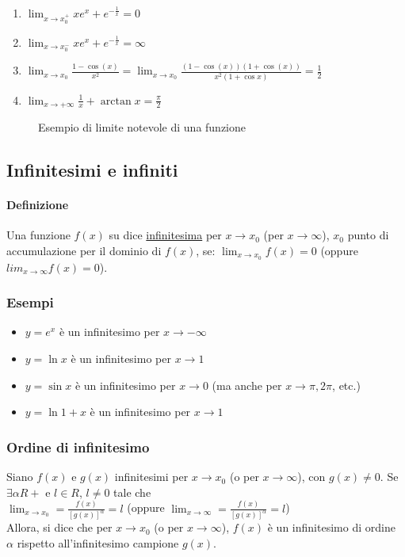 \begin{multicols}{2}
	\begin{enumerate}
		\item $\lim_{x\to x_0^+}xe^x+e^{-\frac{1}{x}}=0$
		\item $\lim_{x\to x_0^-}xe^x+e^{-\frac{1}{x}}=\infty$
		\item $\lim_{x\to x_0}\frac{1-\cos (x)}{x^2}=\lim_{x\to
			x_0}\frac{(1-\cos (x))(1+\cos (x))}{x^2(1+\cos x)}=\frac{1}{2}$
		\item $\lim_{x\to +\infty}\frac{1}{x}+\arctan{x}=\frac{\pi}{2}$
	\end{enumerate}
\end{multicols}
\begin{figure}[!ht]
	\centering
	\caption{Esempio di limite notevole di una funzione}
\end{figure}

\subsection{Infinitesimi e infiniti}
\paragraph{Definizione}
Una funzione $f(x)$ su dice \underline{infinitesima} per $x\to x_0$ (per $x\to \infty$), $x_0$ punto di accumulazione per il dominio di $f(x)$, se: $\lim_{x\to x_0}f(x)=0$ (oppure $lim_{x\to \infty}f(x)=0$).
\subsubsection{Esempi}
\begin{itemize}
	\item $y=e^x$ è un infinitesimo per $x\to -\infty$
	\item $y=\ln{x}$ è un infinitesimo per $x\to 1$
	\item $y=\sin{x}$ è un infinitesimo per $x\to 0$ (ma anche per $x\to \pi,2\pi$, etc.)
	\item $y=\ln{1+x}$ è un infinitesimo per $x\to 1$ 
\end{itemize}
\subsubsection{Ordine di infinitesimo}
Siano $f(x)$ e $g(x)$ infinitesimi per $x\to{x_0}$ (o per $x\to \infty$), con $g(x)\neq 0$. Se $\exists\alpha R+$ e $l\in R$, $l\neq 0$ tale che\\
$\lim_{x\to{x_0}}=\frac{f(x)}{[g(x)]^\alpha}=l$ (oppure $\lim_{x\to{\infty}}=\frac{f(x)}{[g(x)]^\alpha}=l$)\\
Allora, si dice che per $x\to x_0$ (o per $x\to \infty$), $f(x)$ è un infinitesimo di ordine $\alpha$ rispetto all'infinitesimo campione $g(x)$.
